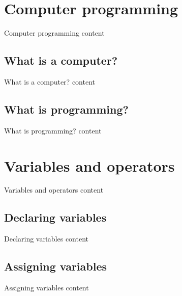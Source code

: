 \chapter{Computer programming}

Computer programming content

\section{What is a computer?}

What is a computer? content

\section{What is programming?}

What is programming? content

\chapter{Variables and operators}

Variables and operators content

\section{Declaring variables}

Declaring variables content

\section{Assigning variables}

Assigning variables content
